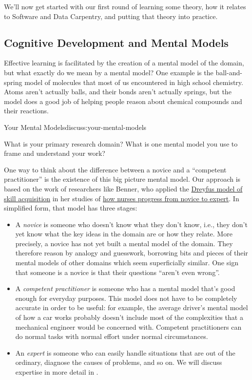 
We'll now get started with our first round of learning some theory, how
it relates to Software and Data Carpentry, and putting that theory into
practice.

\subsection{Cognitive Development and Mental
Models}\label{cognitive-development-and-mental-models}

Effective learning is facilitated by the creation of a mental model of
the domain, but what exactly do we mean by a mental model? One example
is the ball-and-spring model of molecules that most of us encountered in
high school chemistry. Atoms aren't actually balls, and their bonds
aren't actually springs, but the model does a good job of helping people
reason about chemical compounds and their reactions.

\begin{discussion}{Your Mental Models}{discuss:your-mental-models}

What is your primary research domain? What is one mental model you use
to frame and understand your work?
\end{discussion}

One way to think about the difference between a novice and a ``competent
practitioner'' is the existence of this big picture mental model. Our
approach is based on the work of researchers like Benner, who applied
the
\href{https://en.wikipedia.org/wiki/Dreyfus\_model\_of\_skill\_acquisition}{Dreyfus
model of skill acquisition} in her studies of
\href{http://www.amazon.com/Novice-Expert-Excellence-Clinical-Practice/dp/020100299X/}{how
nurses progress from novice to expert}. In simplified form, that model
has three stages:

\begin{itemize}
\item
  A \emph{novice} is someone who doesn't know what they don't know,
  i.e., they don't yet know what the key ideas in the domain are or how
  they relate. More precisely, a novice has not yet built a mental model
  of the domain. They therefore reason by analogy and guesswork,
  borrowing bits and pieces of their mental models of other domains
  which seem superficially similar. One sign that someone is a novice is
  that their questions ``aren't even wrong''.
\item
  A \emph{competent practitioner} is someone who has a mental model
  that's good enough for everyday purposes. This model does not have to
  be completely accurate in order to be useful: for example, the average
  driver's mental model of how a car works probably doesn't include most
  of the complexities that a mechanical engineer would be concerned
  with. Competent practitioners can do normal tasks with normal effort
  under normal circumstances.
\item
  An \emph{expert} is someone who can easily handle situations that are
  out of the ordinary, diagnose the causes of problems, and so on. We
  will discuss expertise in more detail in .
\end{itemize}

